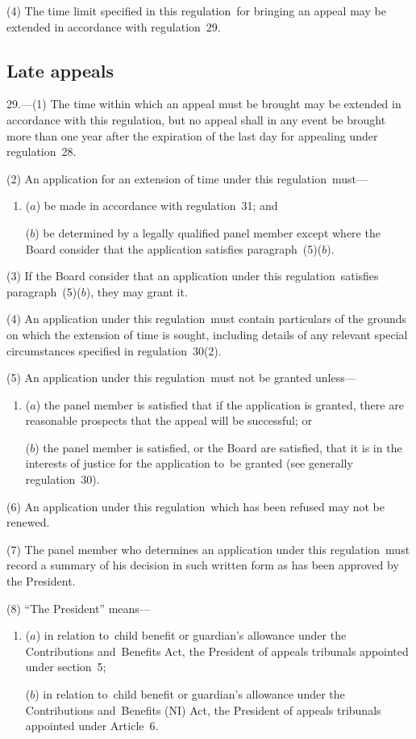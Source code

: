 \documentclass[12pt,a4paper]{article}
\begin{document}
(4) The time limit specified in this regulation~for bringing an appeal may be extended in accordance with regulation~29.

\subsection[29. Late appeals]{Late appeals}

29.---(1)  The time within which an appeal must be brought may be extended in accordance with this regulation, but no appeal shall in any event be brought more than one year after the expiration of the last day for appealing under regulation~28.

(2) An application for an extension of time under this regulation~must—
\begin{enumerate}\item[]
($a$) be made in accordance with regulation~31; and

($b$) be determined by a legally qualified panel member except where the Board consider that the application satisfies paragraph~(5)($b$).
\end{enumerate}

(3) If the Board consider that an application under this regulation~satisfies paragraph~(5)($b$), they may grant it.

(4) An application under this regulation~must contain particulars of the grounds on which the extension of time is sought, including details of any relevant special circumstances specified in regulation~30(2).

(5) An application under this regulation~must not be granted unless---
\begin{enumerate}\item[]
($a$) the panel member is satisfied that if the application is granted, there are reasonable prospects that the appeal will be successful; or

($b$) the panel member is satisfied, or the Board are satisfied, that it is in the interests of justice for the application to~be granted (see generally regulation~30).
\end{enumerate}

(6) An application under this regulation~which has been refused may not be renewed.

(7) The panel member who determines an application under this regulation~must record a summary of his decision in such written form as has been approved by the President.

(8) “The President” means—
\begin{enumerate}\item[]
($a$) in relation to~child benefit or guardian’s allowance under the Contributions and~Benefits Act, the President of appeals tribunals appointed under section~5;

($b$) in relation to~child benefit or guardian’s allowance under the Contributions and~Benefits (NI) Act, the President of appeals tribunals appointed under Article~6.
\end{enumerate}
\end{document}
